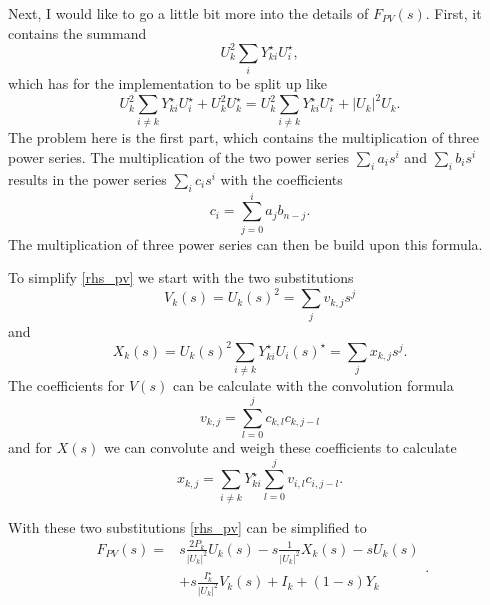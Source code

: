 Next, I would like to go a little bit more into the details of $F_{PV}(s)$. First, it contains the summand 
\begin{equation}
	U_k^2 \sum_i Y_{ki}^\star U_i^\star,
\end{equation}
which has for the implementation to be split up like
\begin{equation}
	U_k^2 \sum_{i \ne k} Y_{ki}^\star U_i^\star + U_k^2 U_k^\star = U_k^2 \sum_{i \ne k} Y_{ki}^\star U_i^\star + |U_k|^2 U_k.
\end{equation}
The problem here is the first part, which contains the multiplication of three power series. The multiplication of the two power series $\sum_i a_i s^i$ and $\sum_i b_i s^i$ results in the power series $\sum_i c_i s^i$ with the coefficients
\begin{equation}
	c_i = \sum_{j = 0}^i a_j b_{n - j}.
\end{equation}
The multiplication of three power series can then be build upon this formula.

To simplify \eqref{rhs_pv} we start with the two substitutions
\begin{equation}
	V_k(s) = U_k(s)^2 = \sum_j v_{k,j} s^j
\end{equation}
and
\begin{equation}
	X_k(s) = U_k(s)^2 \sum_{i \ne k} Y_{ki}^\star U_i(s)^\star = \sum_j x_{k,j} s^j.
\end{equation}
The coefficients for $V(s)$ can be calculate with the convolution formula
\begin{equation}
	v_{k,j} = \sum_{l = 0}^j c_{k,l} c_{k,j - l}
\end{equation}
and for $X(s)$ we can convolute and weigh these coefficients to calculate
\begin{equation}
	x_{k,j} = \sum_{i \ne k} Y_{ki}^\star \sum_{l = 0}^j v_{i,l} c_{i,j - l}.
\end{equation}

With these two substitutions \eqref{rhs_pv} can be simplified to
\begin{equation}
	\begin{split}
		F_{PV}(s) = 
			& s \frac{2 P_k}{|U_k|^2} U_k(s) - s \frac{1}{|U_k|^2} X_k(s) - s U_k(s) \\
			& + s \frac{I_k^\star}{|U_k|^2} V_k(s) + I_k + (1 - s) Y_k
	\end{split}.
\end{equation}

